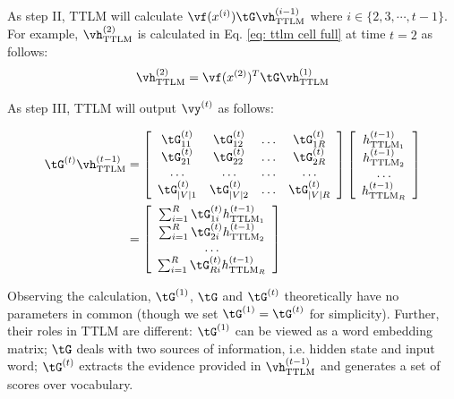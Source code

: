 As step II, TTLM will calculate 
$\vf(x^{(i)})\tG\vh^{(i-1)}_{\textrm{TTLM}}$ where $i \in \{2,3,\cdots,t-1\}$. For example, $\vh_{\textrm{TTLM}}^{(2)}$ is calculated in Eq. \ref{eq: ttlm cell full} at time $t= 2$ as follows: 
\begin{align}
    \vh_{\textrm{TTLM}}^{(2)} = \vf(x^{(2)})^T\tG  \vh^{(1)}_{\textrm{TTLM}} \nonumber 
\end{align}





As step III, TTLM will output $\vy^{(t)}$ as follows:

\begin{align}
\tG^{(t)}\vh^{(t-1)}_{\textrm{TTLM}} &= 
\left[\begin{array}{cccc}
\tG_{11}^{(t)} & \tG_{12}^{(t)} & \ldots & \tG_{1 R}^{(t)} \\
\tG_{21}^{(t)} & \tG_{22}^{(t)} & \ldots & \tG_{2 R}^{(t)} \\
\ldots & \ldots & \ldots & \ldots \\
\tG_{|V| 1}^{(t)} & \tG_{|V| 2}^{(t)} & \ldots & \tG_{|V| R}^{(t)}
\end{array}\right] \left[\begin{array}{c}
h^{(t-1)}_{{\textrm{TTLM}}_1} \\
h^{(t-1)}_{{\textrm{TTLM}}_2} \\
\ldots \\
h^{(t-1)}_{{\textrm{TTLM}}_R}
\end{array}\right] \nonumber \\ 
&= \left[\begin{array}{c}
\sum_{i=1}^{R}\tG_{1i}^{(t)} h^{(t-1)}_{{\textrm{TTLM}}_1}  \\
\sum_{i=1}^{R}\tG_{2i}^{(t)} h^{(t-1)}_{{\textrm{TTLM}}_2} \\
\ldots \\
\sum_{i=1}^{R}\tG_{Ri}^{(t)} h^{(t-1)}_{{\textrm{TTLM}}_R} 
\end{array}\right] \nonumber
\end{align}

Observing the calculation, $\tG^{(1)}$, $\tG$ and $\tG^{(t)}$ theoretically have no parameters in common (though we set $\tG^{(1)} = \tG^{(t)}$ for simplicity). Further, their roles in TTLM are different: $\tG^{(1)}$ can be viewed as a word embedding matrix; $\tG$ deals with two sources of information, i.e. hidden state and input word; $\tG^{(t)}$ extracts the evidence provided in $\vh^{(t-1)}_{\textrm{TTLM}}$ and generates a set of scores over vocabulary. 



